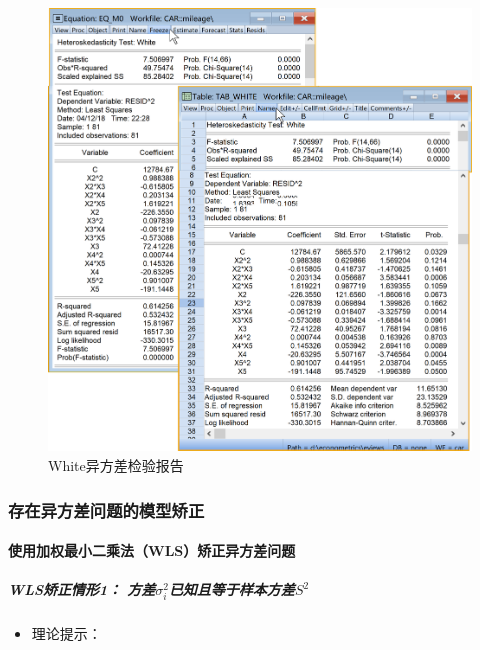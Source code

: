 \documentclass[12pt,(landscape,a4paper),(portrait,a4paper)]{article}
\providecommand{\tightlist}{%
  \setlength{\itemsep}{0pt}\setlength{\parskip}{0pt}}
\let\oldparagraph\paragraph
\renewcommand{\paragraph}[1]{\oldparagraph{#1}\mbox{}}
\let\oldsubparagraph\subparagraph
\renewcommand{\subparagraph}[1]{\oldsubparagraph{#1}\mbox{}}
\begin{document}
\begin{figure}

{\centering \includegraphics[width=28.94in]{picture/lab6-heteroskedasticity/4-test-white2} 

}

\caption{White异方差检验报告}\label{fig:fig-white-report}
\end{figure}

\subsubsection{存在异方差问题的模型矫正}

\hypertarget{wls}{%
\paragraph{使用加权最小二乘法（WLS）矫正异方差问题}\label{wls}}

\hypertarget{wls1-sigma2_is2}{%
\subparagraph{\texorpdfstring{WLS矫正情形1：
方差\(\sigma^2_i\)已知且等于样本方差\(S^2\)}{WLS矫正情形1： 方差\textbackslash{}sigma\^{}2\_i已知且等于样本方差S\^{}2}}\label{wls1-sigma2_is2}}

\begin{itemize}
\tightlist
\item
  理论提示：
\end{itemize}
\end{document}
